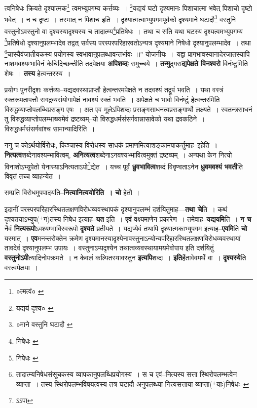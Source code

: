 \documentclass[article,12pt,a4paper]{memoir}
\newcommand{\add}[1]{($^{+}$#1)}
\begin{document}
	त्वनिषेधः क्रियते दृश्यात्मक\footnote{०त्मत्वं० \cite{dp-msA} \cite{dp-edP} \cite{dp-edH} \cite{dp-edE} \cite{dp-edN}} त्वमभ्युपगम्य कर्त्तव्यः । \footnote{यद्ययं दृश्य० \cite{dp-msA} \cite{dp-edP} \cite{dp-edH} \cite{dp-edE} \cite{dp-edN}}\-यद्ययं घटो दृश्यमानः पिशाचात्मा भवेत् पिशाचो दृष्टो भवेत् । न च दृष्टः । तस्मात् न पिशाच इति । दृश्यात्मत्वाभ्युपगमपूर्वको दृश्यमाने घटादौ\footnote{०माने वस्तुनि घटादौ \cite{dp-msC}} वस्तुनि वस्तुनोऽवस्तुनो वा दृश्यस्यादृश्यस्य च तादात्म्य\footnote{निषेधः \cite{dp-msA} \cite{dp-msB} \cite{dp-edP} \cite{dp-edH} \cite{dp-edE} \cite{dp-edN}}\-प्रतिषेधः । तथा च सति यथा घटस्य दृश्यत्वमभ्युपगम्य \footnote{निपेधः \cite{dp-msB}}\-प्रतिषेधो दृश्यानुपलम्भादेव तद्वत् सर्वस्य परस्परपरिहारवतोऽन्यत्र दृश्यमाने निषेधो दृश्यानुपलम्भादेव । तथा \footnote{तादात्म्यनिषेधसंसूचकस्य व्यापकानुपलब्धिप्रयोगस्य । स च एवं--नित्यस्य सत्ता स्थिरोपलम्भत्वेन व्याप्ता । तस्य स्थिरोपलम्भविषयत्वस्य तत्र घटादौ अनुपलब्ध्या नित्यसत्ताया व्याप्ता\add{याः}निषेधः--\cite{dp-msD-n}}\-चास्यैवंजातीयकस्य प्रयोगस्य स्वभावानुपलब्धावन्तर्भावः ॥” योजनीयः । यद्वा प्रागभावस्यानादेरजातस्यापि नाशमवश्यम्भाविनं केचिदिच्छन्तीति तदपेक्षया \textbf{अपिशब्दः} समुच्चये । \textbf{तन्मु}द्गरा\textbf{द्यपेक्षते विनश्वरो} विनंष्टुमिति शेषः । \textbf{तस्य} हेत्वन्तरस्य ।
	\pend
      

	  \pstart प्रयोगः पुनरीदृशः कर्त्तव्यः--यद्यदवस्थाप्राप्तौ हेत्वन्तरमपेक्षते न तदवश्यं तद्रूपं भवति । यथा वस्त्रं रक्तरूपतापत्तौ रागद्रव्यसंयोगापेक्षं नावश्यं रक्तं भवति । अपेक्षते च भावो विनंष्टुं हेत्वन्तरमिति विरुद्धव्याप्तोपलब्धिप्रसङ्ग एषः । अत एव मूलेऽपिशब्दः प्रसङ्गसाधनत्वप्रसङ्गार्थो लक्ष्यते । स्वतन्त्रसाधनं तु विरुद्धव्याप्तोपलम्भाख्यमेवं द्रष्टव्यम्--यो विरुद्धधर्मसंसर्गवान्नासावेको यथा द्रवकठिने । विरुद्धधर्मसंसर्गवांश्च सामान्यादिरिति ।
	\pend
      

	  \pstart ननु च कोऽर्थयोर्विरोधः, किञ्चास्य विरोधस्य साधकं प्रमाणमित्याशङ्कामपाकर्त्तुमाह--इहेति । \textbf{नित्यत्व}शब्देनावश्यम्भावित्वम्, \textbf{अनित्यत्व}शब्देनाऽनवश्यभ्भावित्वमुक्तं द्रष्टव्यम् । अन्यथा केन नित्यो विनाशोऽभ्युपेतो येनास्याऽनित्यताऽपो\footnote{ऽऽपा}\-द्येत । यच्च पूर्वं \textbf{ध्रुवभावित्व}शब्दं विवृण्वताऽनेन \textbf{ध्रुवमवश्यं भवती}ति विवृतं तच्च व्याहन्येत ।
	\pend
      

	  \pstart सम्प्रति विरोधमुपपादयति--\textbf{नित्यानित्ययोरिति । चो} हेतौ ।
	\pend
      

	  \pstart इदानीं परस्परपरिहारस्थितलक्षणविरोधव्यवस्थापकं दृश्यानुपलम्भं दर्शयितुमाह—\textbf{तथा चे}ति । कथं दृश्यतयाऽभ्युप\add{ग}तस्य निषेध इत्याह--\textbf{यत} इति । \textbf{एवं} वक्ष्यमाणेन प्रकारेण । तमेवाह--\textbf{यद्ययमि}ति । \textbf{न च} नैवं \textbf{नित्यरूपो}ऽवश्यम्भाविस्वरूपो \textbf{दृश्यते} प्रतीयते । यद्यप्येवं तथापि दृश्यात्मकाभ्युपगम इत्याह--\textbf{एवमि}ति \textbf{चो} यस्मात् । \textbf{एव}मनन्तरोक्तेन क्रमेण दृश्यमानस्यादृश्येनावस्तुनाऽन्योन्यपरिहारस्थितलक्षणविरोधव्यवस्थायां तावदेवं दृश्यानुपलम्भ उपायः । वस्तुनाऽप्यदृश्येन तथात्वव्यवस्थायामयमेवोपाय इति दर्शयितुं \textbf{वस्तुनोऽपी}त्यादिनोपक्रमते । न केवलं कल्पितस्यावस्तुन \textbf{इत्यपि}शब्दः । \textbf{इति}र्हेतावेवमर्थे वा । \textbf{दृश्यस्ये}ति वस्त्वपेक्षया ।
	\pend
	  \bigskip
	  \begingroup
	
\end{document}
